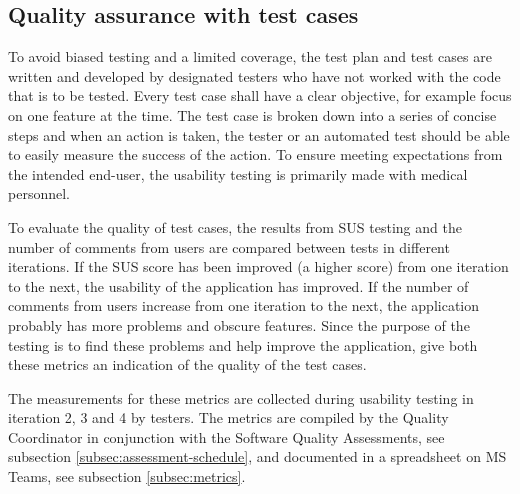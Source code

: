
\subsection{Quality assurance with test cases}
To avoid biased testing and a limited coverage, the test plan and test cases are written and developed by designated testers who have not worked with the code that is to be tested. Every test case shall have a clear objective, for example focus on one feature at the time. The test case is broken down into a series of concise steps and when an action is taken, the tester or an automated test should be able to easily measure the success of the action. To ensure meeting expectations from the intended end-user, the usability testing is primarily made with medical personnel.

To evaluate the quality of test cases, the results from SUS testing and the number of comments from users are compared between tests in different iterations. If the SUS score has been improved (a higher score) from one iteration to the next, the usability of the application has improved. If the number of comments from users increase from one iteration to the next, the application probably has more problems and obscure features. Since the purpose of the testing is to find these problems and help improve the application, give both these metrics an indication of the quality of the test cases.

The measurements for these metrics are collected during usability testing in iteration 2, 3 and 4 by testers. The metrics are compiled by the Quality Coordinator in conjunction with the Software Quality Assessments, see subsection \ref{subsec:assessment-schedule}, and documented in a spreadsheet on MS Teams, see subsection \ref{subsec:metrics}.